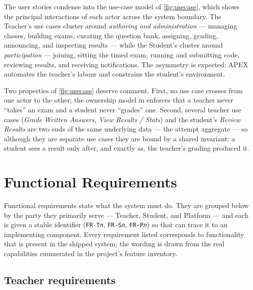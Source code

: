 The user stories condense into the use-case model of \cref{fig:usecase}, which shows the
principal interactions of each actor across the system boundary. The Teacher's use cases
cluster around \emph{authoring and administration} --- managing classes, building exams,
curating the question bank, assigning, grading, announcing, and inspecting results ---
while the Student's cluster around \emph{participation} --- joining, sitting the timed
exam, running and submitting code, reviewing results, and receiving notifications. The
asymmetry is expected: APEX automates the teacher's labour and constrains the student's
environment.



Two properties of \cref{fig:usecase} deserve comment. First, no use case crosses from
one actor to the other; the ownership model in  enforces that a
teacher never ``takes'' an exam and a student never ``grades'' one. Second, several
teacher use cases (\textsl{Grade Written Answers}, \textsl{View Results / Stats}) and
the student's \textsl{Review Results} are two ends of the same underlying data ---
the attempt aggregate --- so although they are separate use cases they are bound by a
shared invariant: a student sees a result only after, and exactly as, the teacher's
grading produced it.

\section{Functional Requirements}
\label{sec:req-fr}

Functional requirements state what the system must do. They are grouped below by the
party they primarily serve --- Teacher, Student, and Platform --- and each is given a
stable identifier (\texttt{FR-T\emph{n}}, \texttt{FR-S\emph{n}}, \texttt{FR-P\emph{n}})
so that  can trace it to an implementing component. Every
requirement listed corresponds to functionality that is present in the shipped system;
the wording is drawn from the real capabilities enumerated in the project's feature
inventory.

\subsection{Teacher requirements}
\label{sec:req-fr-teacher}


